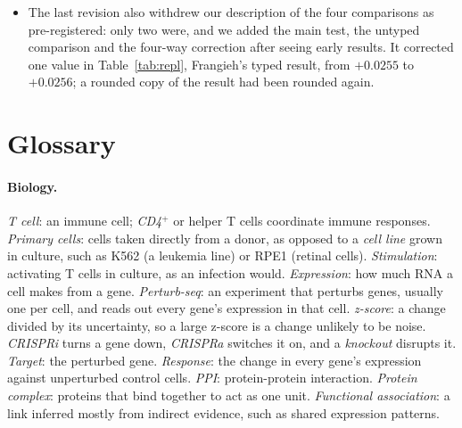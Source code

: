 \documentclass{article}
\begin{document}
\begin{itemize}
features); that the source ablation measures the rationale's sufficiency (it measures how far the full
prediction moves); that the untyped model differs from the typed one only in types and gates; that the
gates can switch off single unhelpful edges; and that the evidence labels do not explain the typed model's
shortfall. They also corrected the pilot's timing (the $98\%$ was after two epochs, not one), one interval
bound in Appendix~\ref{app:causes} ($-0.00290$, printed as $-0.00291$) and the reason given for the
collapse (the direction of the push, not only its size). They removed the architecture figure, three
result figures, the architecture search table, a case study of our pre-registration, the power analysis,
the split-variance analysis and all appendix tables; the previous version's source, in the public
repository's history, reports them (its figure files are not in the repository).
\item The last revision also withdrew our description of the four comparisons as pre-registered: only two
were, and we added the main test, the untyped comparison and the four-way correction after seeing early
results. It corrected one value in Table~\ref{tab:repl}, Frangieh's typed result, from $+0.0255$ to
$+0.0256$; a rounded copy of the result had been rounded again.
\end{itemize}

\section{Glossary}
\label{app:glossary}

\paragraph{Biology.} \emph{T cell}: an immune cell; \emph{CD4$^{+}$} or helper T cells coordinate immune
responses. \emph{Primary cells}: cells taken directly from a donor, as opposed to a \emph{cell line} grown
in culture, such as K562 (a leukemia line) or RPE1 (retinal cells). \emph{Stimulation}: activating T cells
in culture, as an infection would. \emph{Expression}: how much RNA a cell makes from a gene.
\emph{Perturb-seq}: an experiment that perturbs genes, usually one per cell, and reads out every gene's
expression in that cell. \emph{z-score}: a change divided by its uncertainty, so a large z-score is a
change unlikely to be noise. \emph{CRISPRi} turns a gene down, \emph{CRISPRa} switches it on, and a
\emph{knockout} disrupts it. \emph{Target}: the perturbed gene. \emph{Response}: the change in every gene's
expression against unperturbed control cells. \emph{PPI}: protein-protein interaction. \emph{Protein
complex}: proteins that bind together to act as one unit. \emph{Functional association}: a link inferred
mostly from indirect evidence, such as shared expression patterns.
\end{document}
